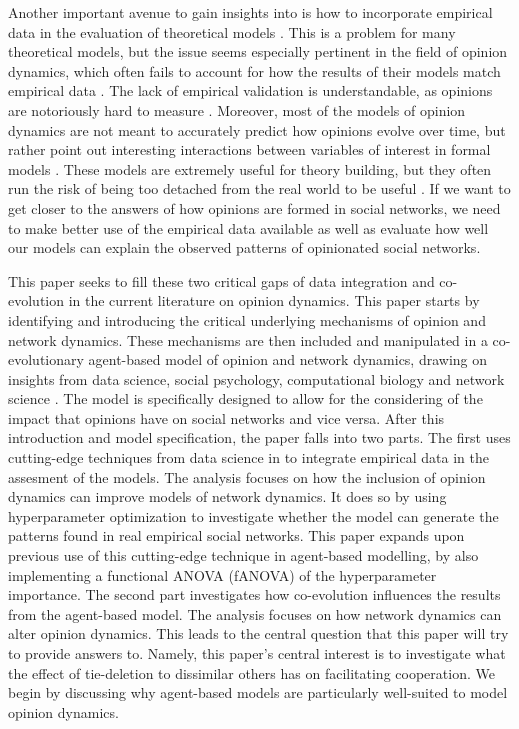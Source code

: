 \documentclass{article}
\begin{document}
Another important avenue to gain insights into is how to incorporate empirical data in the evaluation of theoretical models \cite{mas2019challenges}. This is a problem for many theoretical models, but the issue seems especially pertinent in the field of opinion dynamics, which often fails to account for how the results of their models match empirical data \cite{galesic_integrating_2021,flache_models_2017, mas2019challenges}. 
The lack of empirical validation is understandable, as opinions are notoriously hard to measure \cite{mas2019challenges}. Moreover, most of the models of opinion dynamics are not meant to accurately predict how opinions evolve over time, but rather point out interesting interactions between variables of interest in formal models \cite{mas2019challenges}. These models are extremely useful for theory building, but they often run the risk of being too detached from the real world to be useful \cite{smaldino_how_2020, mas2019challenges}. If we want to get closer to the answers of how opinions are formed in social networks, we need to make better use of the empirical data available as well as evaluate how well our models can explain the observed patterns of opinionated social networks. 

\noindent This paper seeks to fill these two critical gaps of data integration and co-evolution in the current literature on opinion dynamics. This paper starts by identifying and introducing the critical underlying mechanisms of opinion and network dynamics. These mechanisms are then included and manipulated in a co-evolutionary agent-based model of opinion and network dynamics, drawing on insights from data science, social psychology, computational biology and network science \cite{asikainen_cumulative_2020,flache_models_2017,ilany_social_2016,jackson_meeting_2007,santos_cooperation_2006}. The model is specifically designed to allow for the considering of the impact that opinions have on social networks and vice versa. 
After this introduction and model specification, the paper falls into two parts. The first uses cutting-edge techniques from data science in to integrate empirical data in the assesment of the models. The analysis focuses on how the inclusion of opinion dynamics can improve models of network dynamics. It does so by using hyperparameter optimization to investigate whether the model can generate the patterns found in real empirical social networks. This paper expands upon previous use of this cutting-edge technique in agent-based modelling, by also implementing a functional ANOVA (fANOVA) of the hyperparameter importance. 
The second part investigates how co-evolution influences the results from the agent-based model. The analysis focuses on how network dynamics can alter opinion dynamics. This leads to the central question that this paper will try to provide answers to. Namely, this paper’s central interest is to investigate what the effect of tie-deletion to dissimilar others has on facilitating cooperation. 
We begin by discussing why agent-based models are particularly well-suited to model opinion dynamics.
\end{document}
